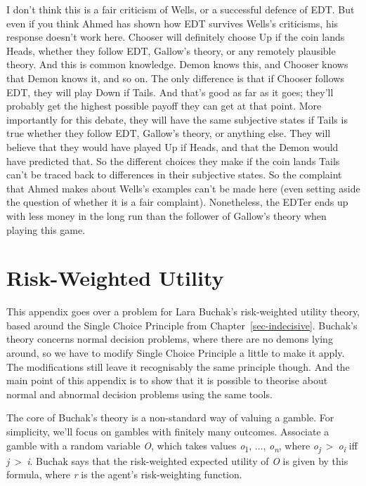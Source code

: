 \documentclass[
  12pt,
  letterpaper,
  DIV=11,
  numbers=noendperiod]{scrreprt}
\begin{document}
I don't think this is a fair criticism of Wells, or a successful defence
of EDT. But even if you think Ahmed has shown how EDT survives Wells's
criticisms, his response doesn't work here. Chooser will definitely
choose Up if the coin lands Heads, whether they follow EDT, Gallow's
theory, or any remotely plausible theory. And this is common knowledge.
Demon knows this, and Chooser knows that Demon knows it, and so on. The
only difference is that if Chooser follows EDT, they will play Down if
Tails. And that's good as far as it goes; they'll probably get the
highest possible payoff they can get at that point. More importantly for
this debate, they will have the same subjective states if Tails is true
whether they follow EDT, Gallow's theory, or anything else. They will
believe that they would have played Up if Heads, and that the Demon
would have predicted that. So the different choices they make if the
coin lands Tails can't be traced back to differences in their subjective
states. So the complaint that Ahmed makes about Wells's examples can't
be made here (even setting aside the question of whether it is a fair
complaint). Nonetheless, the EDTer ends up with less money in the long
run than the follower of Gallow's theory when playing this game.

\chapter{Risk-Weighted Utility}\label{sec-buchak}

This appendix goes over a problem for Lara Buchak's risk-weighted
utility theory, based around the Single Choice Principle from
Chapter~\ref{sec-indecisive}. Buchak's theory concerns normal decision
problems, where there are no demons lying around, so we have to modify
Single Choice Principle a little to make it apply. The modifications
still leave it recognisably the same principle though. And the main
point of this appendix is to show that it is possible to theorise about
normal and abnormal decision problems using the same tools.

The core of Buchak's theory is a non-standard way of valuing a gamble.
For simplicity, we'll focus on gambles with finitely many outcomes.
Associate a gamble with a random variable \emph{O}, which takes values
\emph{o}\textsubscript{1}, \(\dots\), \emph{o\textsubscript{n}}, where
\emph{o\textsubscript{j}}~\textgreater~\emph{o\textsubscript{i}} iff
\emph{j}~\textgreater~\emph{i}. Buchak says that the risk-weighted
expected utility of \emph{O} is given by this formula, where \emph{r} is
the agent's risk-weighting function.
\end{document}
